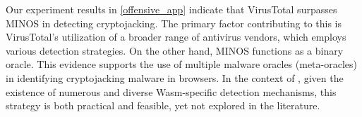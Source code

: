\begin{strategy}
    \label{meta-oracles}
    Our experiment results in \autoref{offensive_app}  indicate that VirusTotal surpasses MINOS in detecting \Wasm cryptojacking. 
    The primary factor contributing to this is VirusTotal's utilization of a broader range of antivirus vendors, which employs various detection strategies. 
    On the other hand, MINOS functions as a binary oracle. 
    This evidence supports the use of multiple malware oracles (meta-oracles) in identifying cryptojacking malware in browsers. 
    In the context of \Wasm, given the existence of numerous and diverse Wasm-specific detection mechanisms, this strategy is both practical and feasible, yet not explored in the literature.




\end{strategy}
    